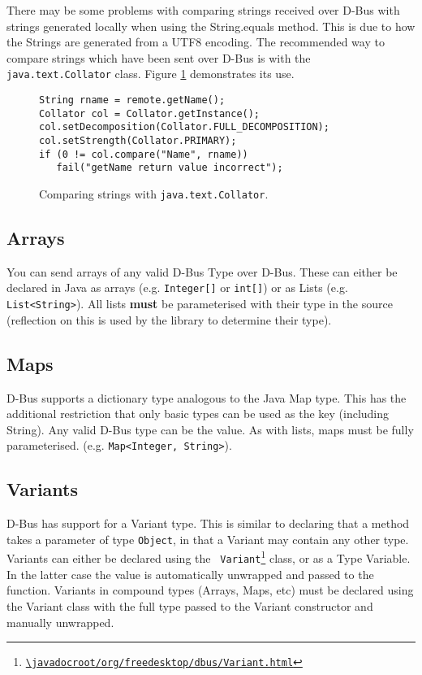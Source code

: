 \documentclass[a4paper,12pt]{article}
\begin{document}
There may be some problems with comparing strings received over D-Bus with
strings generated locally when using the String.equals method. This is due to
how the Strings are generated from a UTF8 encoding. The recommended way to
compare strings which have been sent over D-Bus is with the {\tt
java.text.Collator} class. Figure \ref{fig:collator} demonstrates its use.

\begin{figure}[htb]
\begin{center}
\begin{verbatim}
String rname = remote.getName();
Collator col = Collator.getInstance();
col.setDecomposition(Collator.FULL_DECOMPOSITION);
col.setStrength(Collator.PRIMARY);
if (0 != col.compare("Name", rname))
   fail("getName return value incorrect");
\end{verbatim}
\end{center}
\caption{Comparing strings with {\tt java.text.Collator}.}
\label{fig:collator}
\end{figure}

\subsection{Arrays}

You can send arrays of any valid D-Bus Type over D-Bus. These can
either be declared in Java as arrays (e.g. \verb&Integer[]& or
\verb&int[]&) or as Lists (e.g. \verb&List<String>&). All lists {\bf
must} be parameterised with their type in the source (reflection on
this is used by the library to determine their type).

\subsection{Maps}

D-Bus supports a dictionary type analogous to the Java Map type. This
has the additional restriction that only basic types can be used as
the key (including String). Any valid D-Bus type can be the value. As
with lists, maps must be fully parameterised. (e.g.
\verb&Map<Integer, String>&).

\subsection{Variants}

D-Bus has support for a Variant type. This is similar to declaring that a
method takes a parameter of type {\tt Object}, in that a Variant may contain
any other type. Variants can either be declared using the {\tt
Variant\footnote{\url{\javadocroot/org/freedesktop/dbus/Variant.html}}} class, or as
a Type Variable. In the latter case the value is automatically unwrapped and
passed to the function. Variants in compound types (Arrays, Maps, etc) must be
declared using the Variant class with the full type passed to the Variant
constructor and manually unwrapped.
\end{document}

